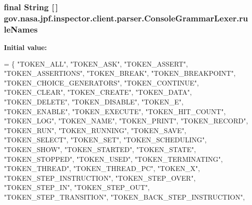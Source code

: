 \subsubsection[{\texorpdfstring{rule\+Names}{ruleNames}}]{\setlength{\rightskip}{0pt plus 5cm}final String \mbox{[}$\,$\mbox{]} gov.\+nasa.\+jpf.\+inspector.\+client.\+parser.\+Console\+Grammar\+Lexer.\+rule\+Names\hspace{0.3cm}{\ttfamily [static]}}\hypertarget{classgov_1_1nasa_1_1jpf_1_1inspector_1_1client_1_1parser_1_1_console_grammar_lexer_a6dfd3b03865de7819bdcc0063436c3c1}{}\label{classgov_1_1nasa_1_1jpf_1_1inspector_1_1client_1_1parser_1_1_console_grammar_lexer_a6dfd3b03865de7819bdcc0063436c3c1}
{\bfseries Initial value\+:}
\begin{DoxyCode}
= \{
    \textcolor{stringliteral}{"TOKEN\_ALL"}, \textcolor{stringliteral}{"TOKEN\_ASK"}, \textcolor{stringliteral}{"TOKEN\_ASSERT"}, \textcolor{stringliteral}{"TOKEN\_ASSERTIONS"}, \textcolor{stringliteral}{"TOKEN\_BREAK"}, 
    \textcolor{stringliteral}{"TOKEN\_BREAKPOINT"}, \textcolor{stringliteral}{"TOKEN\_CHOICE\_GENERATORS"}, \textcolor{stringliteral}{"TOKEN\_CONTINUE"}, \textcolor{stringliteral}{"TOKEN\_CLEAR"}, 
    \textcolor{stringliteral}{"TOKEN\_CREATE"}, \textcolor{stringliteral}{"TOKEN\_DATA"}, \textcolor{stringliteral}{"TOKEN\_DELETE"}, \textcolor{stringliteral}{"TOKEN\_DISABLE"}, \textcolor{stringliteral}{"TOKEN\_E"}, 
    \textcolor{stringliteral}{"TOKEN\_ENABLE"}, \textcolor{stringliteral}{"TOKEN\_EXECUTE"}, \textcolor{stringliteral}{"TOKEN\_HIT\_COUNT"}, \textcolor{stringliteral}{"TOKEN\_LOG"}, \textcolor{stringliteral}{"TOKEN\_NAME"}, 
    \textcolor{stringliteral}{"TOKEN\_PRINT"}, \textcolor{stringliteral}{"TOKEN\_RECORD"}, \textcolor{stringliteral}{"TOKEN\_RUN"}, \textcolor{stringliteral}{"TOKEN\_RUNNING"}, \textcolor{stringliteral}{"TOKEN\_SAVE"}, 
    \textcolor{stringliteral}{"TOKEN\_SELECT"}, \textcolor{stringliteral}{"TOKEN\_SET"}, \textcolor{stringliteral}{"TOKEN\_SCHEDULING"}, \textcolor{stringliteral}{"TOKEN\_SHOW"}, \textcolor{stringliteral}{"TOKEN\_STARTED"}, 
    \textcolor{stringliteral}{"TOKEN\_STATE"}, \textcolor{stringliteral}{"TOKEN\_STOPPED"}, \textcolor{stringliteral}{"TOKEN\_USED"}, \textcolor{stringliteral}{"TOKEN\_TERMINATING"}, \textcolor{stringliteral}{"TOKEN\_THREAD"}, 
    \textcolor{stringliteral}{"TOKEN\_THREAD\_PC"}, \textcolor{stringliteral}{"TOKEN\_X"}, \textcolor{stringliteral}{"TOKEN\_STEP\_INSTRUCTION"}, \textcolor{stringliteral}{"TOKEN\_STEP\_OVER"}, 
    \textcolor{stringliteral}{"TOKEN\_STEP\_IN"}, \textcolor{stringliteral}{"TOKEN\_STEP\_OUT"}, \textcolor{stringliteral}{"TOKEN\_STEP\_TRANSITION"}, \textcolor{stringliteral}{"TOKEN\_BACK\_STEP\_INSTRUCTION"}, 

\end{DoxyCode}
